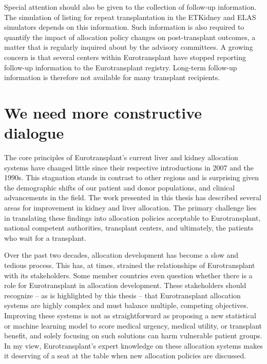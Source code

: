 \documentclass[11pt,twoside,]{book}
\begin{document}
Special attention should also be given to the collection of follow-up
information. The simulation of listing for repeat transplantation in the
ETKidney and ELAS simulators depends on this information. Such information
is also required to quantify the impact of allocation policy changes on post-transplant
outcomes, a matter that is regularly inquired about by the advisory committees.
A growing concern is that several centers within Eurotransplant have stopped
reporting follow-up information to the Eurotransplant registry. Long-term
follow-up information is therefore not available for many transplant
recipients.
\newpage

\section{We need more constructive dialogue}\label{we-need-more-constructive-dialogue}

The core principles of Eurotransplant's current liver and kidney allocation
systems have changed little since their respective introductions in 2007 and the 1990s.
This stagnation stands in contrast to other regions and is
surprising given the demographic shifts of our patient and donor populations,
and clinical advancements in the field. The work presented in this thesis has
described several areas for improvement in kidney and liver allocation.
The primary challenge lies in translating these findings into
allocation policies acceptable to Eurotransplant, national competent authorities,
transplant centers, and ultimately, the patients who wait for a transplant.

Over the past two decades, allocation development has become a slow and tedious
process. This has, at times, strained the relationships of Eurotransplant with its
stakeholders. Some member countries even question whether there is a role for
Eurotransplant in allocation development. These stakeholders should recognize -- as is
highlighted by this thesis -- that Eurotransplant allocation systems are highly
complex and must balance multiple, competing objectives.
Improving these systems is not as straightforward
as proposing a new statistical or machine learning model to score medical
urgency, medical utility, or transplant benefit, and solely focusing on such
solutions can harm vulnerable patient groups. In my view,
Eurotransplant's expert knowledge on these allocation systems makes it deserving
of a seat at the table when new allocation policies are discussed.
\end{document}
